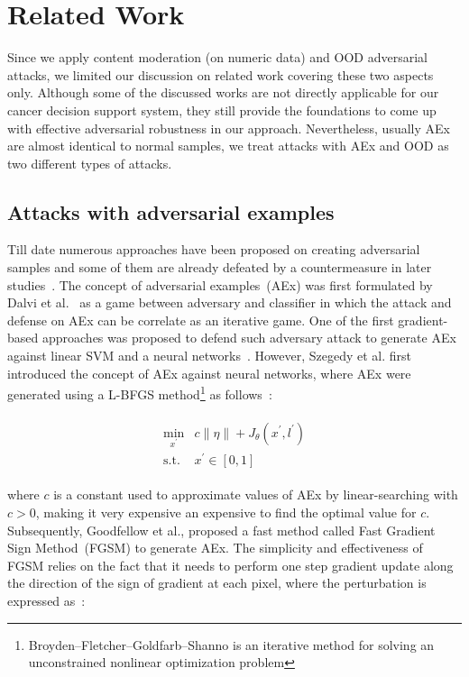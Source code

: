\section{Related Work} \label{chapter_6:rw}
Since we apply content moderation (on numeric data) and OOD adversarial attacks, we limited our discussion on related work covering these two aspects only. Although some of the discussed works are not directly applicable for our cancer decision support system, they still provide the foundations to come up with effective adversarial robustness in our approach. Nevertheless, usually AEx are almost identical to normal samples, we treat attacks with AEx and OOD as two different types of attacks. 

\subsection{Attacks with adversarial examples}
Till date numerous approaches have been proposed on creating adversarial samples and some of them are already defeated by a countermeasure in later studies~\cite{yuan2019adversarial}. The concept of adversarial examples~(AEx) was first formulated by Dalvi et al.~\cite{dalvi2004adversarial} as a game between adversary and classifier in which the attack and defense on AEx can be correlate as an iterative game. One of the first gradient-based approaches was proposed to defend such adversary attack to generate AEx against linear SVM and a neural networks~\cite{biggio2013evasion}. However, Szegedy et al.\cite{szegedy2013intriguing} first introduced the concept of AEx against neural networks, where AEx were generated using a L-BFGS method\footnote{ Broyden–Fletcher–Goldfarb–Shanno is an iterative method for solving an unconstrained nonlinear optimization problem} as follows~\cite{yuan2019adversarial}:

\vspace{-6mm}
\begin{align}
    \begin{array}{cl}
        \min _{x^{\prime}} & c\|\eta\|+J_{\theta}\left(x^{\prime}, l^{\prime}\right) \\
         \text {s.t.} & x^{\prime} \in[0,1]
    \end{array}
    \label{eq:fgsm_aex}
\end{align}

\hspace*{3.5mm} where $c$ is a constant used to approximate values of AEx by linear-searching with $c > 0$, making it very expensive an expensive to find the optimal value for $c$. Subsequently, Goodfellow et al.\cite{goodfellow2014explaining}, proposed a fast method called Fast Gradient Sign Method~(FGSM) to generate AEx. The simplicity and effectiveness of FGSM relies on the fact that it needs to perform one step gradient update along the direction of the sign of gradient at each pixel, where the perturbation is expressed as~\cite{goodfellow2014explaining}: 

